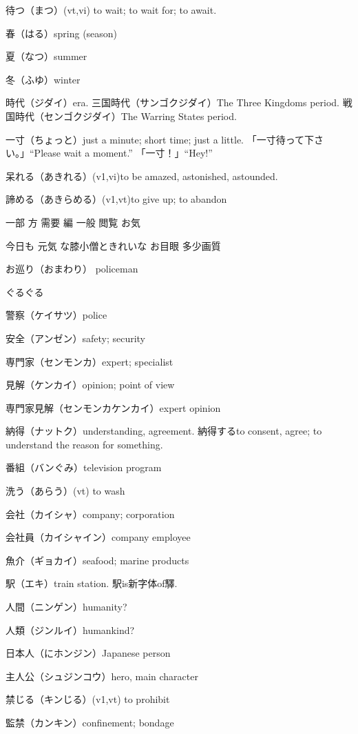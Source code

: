 待つ（まつ）(vt,vi) to wait; to wait for; to await.

春（はる）spring (season)

夏（なつ）summer

冬（ふゆ）winter

時代（ジダイ）era.
三国時代（サンゴクジダイ）The Three Kingdoms period.
戦国時代（センゴクジダイ）The Warring States period.

一寸（ちょっと）just a minute; short time; just a little.
「一寸待って下さい。」``Please wait a moment.''
「一寸！」``Hey!''

呆れる（あきれる）(v1,vi)to be amazed, astonished, astounded.

諦める（あきらめる）(v1,vt)to give up; to abandon

一部
方
需要
編
一般
閲覧
お気

今日も
元気
な膝小僧ときれいな
お目眼
多少画質

お巡り（おまわり）
policeman

ぐるぐる

警察（ケイサツ）police

安全（アンゼン）safety; security

専門家（センモンカ）expert; specialist

見解（ケンカイ）opinion; point of view

専門家見解（センモンカケンカイ）expert opinion

納得（ナットク）understanding, agreement.
納得するto consent, agree; to understand the reason for something.

番組（バンぐみ）television program

洗う（あらう）(vt) to wash

会社（カイシャ）company; corporation

会社員（カイシャイン）company employee

魚介（ギョカイ）seafood; marine products

駅（エキ）train station. 駅is新字体of驛.

人間（ニンゲン）humanity?

人類（ジンルイ）humankind?

日本人（にホンジン）Japanese person

主人公（シュジンコウ）hero, main character

禁じる（キンじる）(v1,vt) to prohibit

監禁（カンキン）confinement; bondage



